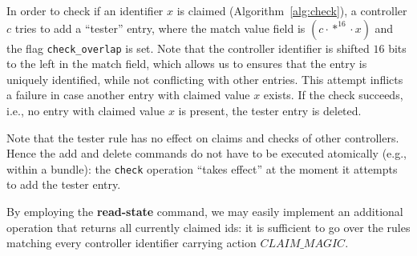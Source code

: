 \documentclass[conference]{sigcomm-alternate}
\newcommand{\concat}[0]{\cdot}
\newcommand{\claimcheck}{check\xspace}
\newcommand{\checko}{\texttt{check\_overlap}\xspace}
\newcommand{\claimmagic}{\textit{CLAIM\_MAGIC}}
\begin{document}
In order to check if an identifier $x$ is claimed
(Algorithm~\ref{alg:check}), a controller $c$ tries to add
a ``tester'' entry, where the match value field is 
$(c\concat*^{16}\concat x)$  and the flag \texttt{\checko} is set.
Note that the controller identifier is shifted $16$ bits to the left in
the match field, which allows us to ensures that the entry is uniquely
identified, while not conflicting with other entries.  
This attempt inflicts a failure in case another entry with claimed
value $x$ exists. 
If the check succeeds, i.e.,  no entry with claimed value $x$ is
present, the tester entry is deleted.   

Note that the tester rule has no effect on claims and checks of other
controllers. Hence the add and delete commands do not have to be
executed atomically (e.g., within a bundle): the \texttt{\claimcheck}
operation ``takes effect'' at the moment it attempts to add the tester entry.   

By employing the \textbf{read-state} command, we may easily implement
an additional operation that returns all currently claimed ids: it is
sufficient to go over the rules matching every controller identifier
carrying action $\claimmagic$.
\end{document}
